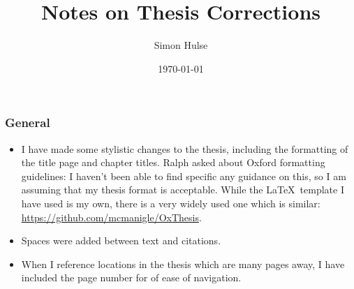 \documentclass[12pt]{article}
\author{Simon Hulse}
\title{Notes on Thesis Corrections}
\date{\today}
\begin{document}
    \maketitle
    \subsubsection*{General}
    \begin{itemize}
        \item I have made some stylistic changes to the thesis, including the
            formatting of the title page and chapter titles. Ralph asked about Oxford
            formatting guidelines: I haven't been able to find specific any
            guidance on this, so I am assuming that my thesis format is acceptable.
            While the \LaTeX\ template I have used is my own, there is a very
            widely used one which is similar:
            \url{https://github.com/mcmanigle/OxThesis}.
        \item Spaces were added between text and citations.
        \item When I reference locations in the thesis which are many pages away, I
            have included the page number for of ease of navigation.
    \end{itemize}
\end{document}
